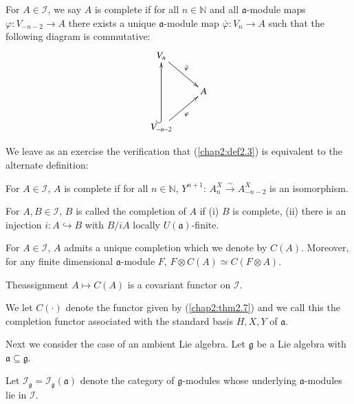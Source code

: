 \begin{definition}\label{chap2:def2.3}%
For $A \in\mathscr{I}$, we say $A$ is complete if for all $n \in
\mathbb{N}$ and all $\mathfrak{a}$-module maps $\varphi: V_{-n-2} \to
A$ there exists a unique $\mathfrak{a}$-module map $\bar{\varphi}:V_n
\to A$ such that the following diagram is commutative:
\[
\xymatrix{
V_n \ar[dr]^{\bar{\varphi}} & \\
& A \\ 
V_{-n-2} \ar[ur]_\varphi \ar@{^{(}->}[uu] & 
}
\]
\end{definition}

We leave as an exercise the verification that (\ref{chap2:def2.3}) is
equivalent to the alternate definition:

\begin{definition}\label{chap2:def2.4}%
For $A \in \mathscr{I}$, $A$ is complete if for all $n \in
\mathbb{N}$, $Y^{n+1}$: $A^X_n \xrightarrow{\sim} A^X_{-n-2}$ is an
isomorphism.
\end{definition}

\begin{definition}\label{chap2:def2.5}%
For $A, B \in\mathscr{I}$, $B$ is called the completion of $A$ if
(i) $B$ is complete, (ii) there is an injection $i: A \hookrightarrow B$
with $B/iA$ locally $U(\mathfrak{a})$-finite.
\end{definition}

\begin{prop}\label{chap2:prop2.6}%
For $A \in \mathscr{I}$, $A$ admits a unique completion which we
denote by $C(A)$. Moreover, for any finite dimensional
$\mathfrak{a}$-module $F$, $F\otimes C(A) \simeq C(F \otimes A)$. 
\end{prop}

\begin{theorem}\label{chap2:thm2.7}
The\pageoriginale assignment $A \mapsto C(A)$ is a covariant functor
on $\mathscr{I}$.
\end{theorem}

We let $C (\cdot)$ denote the functor given by (\ref{chap2:thm2.7})
and we call this the completion functor associated with the standard
basis $H,X,Y$ of $\mathfrak{a}$. 

Next we consider the case of an ambient Lie algebra. Let
$\mathfrak{g}$ be a Lie algebra with $\mathfrak{a} \subseteq
\mathfrak{g}$.

\begin{definition}\label{chap2:def2.8}%
Let $\mathscr{I}_{\mathfrak{g}} = \mathscr{I}_\mathfrak{g}
(\mathfrak{a})$ denote the category of $\mathfrak{g}$-modules whose
underlying $\mathfrak{a}$-modules lie in $\mathscr{I}$.
\end{definition}

